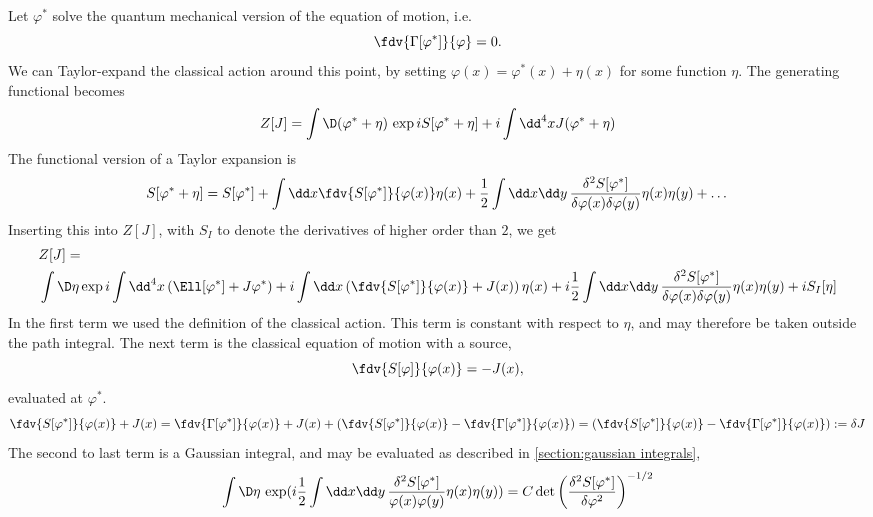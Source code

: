 \documentclass{article}
\begin{document}
Let $\varphi^*$ solve the quantum mechanical version of the equation of motion, i.e.
\begin{equation}
    \fdv{\Gamma[\varphi^*]}{\varphi} = 0.
\end{equation}
We can Taylor-expand the classical action around this point, by setting $\varphi(x) = \varphi^*(x) + \eta(x)$ for some function $\eta$.
The generating functional becomes
\begin{align}
    Z[J] 
    = \int \D (\varphi^* + \eta) \, 
    \exp{i S[\varphi^* + \eta] + i \int \dd^4 x J (\varphi^* + \eta) }
\end{align}
The functional version of a Taylor expansion is
\begin{equation}
    S[\varphi^* + \eta] = 
    S[\varphi^*]
    + \int \dd x \fdv{S[\varphi^*]}{\varphi(x)} \eta(x)
    + \frac{1}{2} \int \dd x \dd y\,  \frac{\delta^2 S[\varphi^*]}{\delta\varphi(x)\delta\varphi(y)} \eta(x) \eta(y)
    + \dots
\end{equation}
Inserting this into $Z[J]$, with $S_I$ to denote the derivatives of higher order than $2$, we get
\begin{align*}
    &Z[J] = \\ 
    &\int \D \eta  
    \exp{
        i \int \dd^4 x \left(  \Ell[\varphi^*] + J \varphi^*  \right)
        + i \int \dd x \left(  \fdv{S[\varphi^*]}{\varphi(x)} + J(x) \right) \eta(x)
        + i \frac{1}{2} \int \dd x \dd y\,  
        \frac{\delta^2 S[\varphi^*]}{\delta\varphi(x)\delta\varphi(y)} \eta(x) \eta(y) 
        + i S_I[\eta]
        }
\end{align*}
In the first term we used the definition of the classical action. This term is constant with respect to $\eta$, and may therefore be taken outside the path integral.
The next term is the classical equation of motion with a source, 
\begin{equation}
    \fdv{S[\varphi]}{\varphi(x)} = - J(x),
\end{equation} 
evaluated at $\varphi^*$.
\begin{equation}
    \fdv{S[\varphi^*]}{\varphi(x)} + J(x)
    = \fdv{\Gamma[\varphi^*]}{\varphi(x)} + J(x)
    + \left(\fdv{S[\varphi^*]}{\varphi(x)} - \fdv{\Gamma[\varphi^*]}{\varphi(x)} \right)
    = \left(\fdv{S[\varphi^*]}{\varphi(x)} - \fdv{\Gamma[\varphi^*]}{\varphi(x)} \right)
    := \delta J
\end{equation}
The second to last term is a Gaussian integral, and may be evaluated as described in \autoref{section:gaussian integrals},
\begin{equation}
    \int \D \eta \, \exp(
        i \frac{1}{2} \int \dd x \dd y\,  
        \frac{\delta^2 S[\varphi^*]}{\varphi(x)\varphi(y)} \eta(x) \eta(y)
        )
        = C \det\left( \frac{\delta^2 S[\varphi^*]}{\delta \varphi^2} \right)^{-1/2}
\end{equation}
\end{document}
